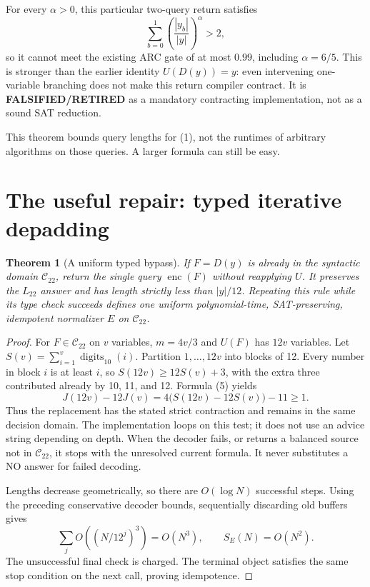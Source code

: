 \documentclass[11pt]{article}
\newtheorem{theorem}{Theorem}
\newcommand{\enc}{\operatorname{enc}}
\begin{document}
For every $\alpha>0$, this particular two-query return satisfies
\[
 \sum_{b=0}^{1}\left(\frac{|y_b|}{|y|}\right)^\alpha>2,    \tag{6}
\]
so it cannot meet the existing ARC gate of at most $0.99$, including
$\alpha=6/5$. This is stronger than the earlier identity
$U(D(y))=y$: even intervening one-variable branching does not make this
return compiler contract. It is \textbf{FALSIFIED/RETIRED} as a mandatory
contracting implementation, not as a sound SAT reduction.

This theorem bounds query lengths for (1), not the runtimes of arbitrary
algorithms on those queries. A larger formula can still be easy.

\section{The useful repair: typed iterative depadding}
\begin{theorem}[A uniform typed bypass]\label{thm:depad}
If $F=D(y)$ is already in the syntactic domain $\mathcal C_{22}$, return the
single query $\enc(F)$ without reapplying $U$. It preserves the $L_{22}$
answer and has length strictly less than $|y|/12$. Repeating this rule while
its type check succeeds defines one uniform polynomial-time, SAT-preserving,
idempotent normalizer $E$ on $\mathcal C_{22}$.
\end{theorem}
\begin{proof}
For $F\in\mathcal C_{22}$ on $v$ variables, $m=4v/3$ and $U(F)$ has $12v$
variables. Let $S(v)=\sum_{i=1}^{v}\operatorname{digits}_{10}(i)$.
Partition $1,\ldots,12v$ into blocks of 12. Every number in block $i$ is at
least $i$, so $S(12v)\ge12S(v)+3$, with the extra three contributed already
by 10, 11, and 12. Formula (5) yields
\[
 J(12v)-12J(v)=4\bigl(S(12v)-12S(v)\bigr)-11\ge1.         \tag{7}
\]
Thus the replacement has the stated strict contraction and remains in the
same decision domain. The implementation loops on this test; it does not use
an advice string depending on depth. When the decoder fails, or returns a
balanced source not in $\mathcal C_{22}$, it stops with the unresolved current
formula. It never substitutes a NO answer for failed decoding.

Lengths decrease geometrically, so there are $O(\log N)$ successful steps.
Using the preceding conservative decoder bounds, sequentially discarding old
buffers gives
\[
 \sum_j O((N/12^j)^3)=O(N^3),\qquad S_E(N)=O(N^2).        \tag{8}
\]
The unsuccessful final check is charged. The terminal object satisfies the
same stop condition on the next call, proving idempotence.
\end{proof}
\end{document}
